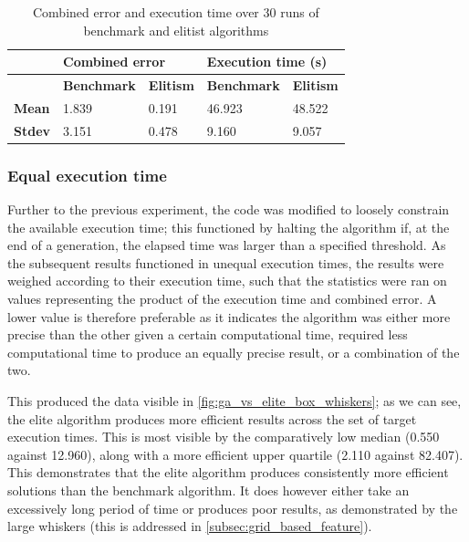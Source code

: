 \documentclass[authoryearcitations]{UoYCSproject}
\begin{document}
\begin{table}
\centering
\begin{tabular}{|l|l|l|l|l|}
\hline & \multicolumn{2}{l|}{\textbf{Combined error}} & \multicolumn{2}{l|}{\textbf{Execution time (s)}} \\ \hline & 
\textbf{Benchmark} & \textbf{Elitism}& \textbf{Benchmark}   & \textbf{Elitism}  \\ \hline 
\textbf{Mean} & 1.839   & 0.191  & 46.923 & 48.522  \\ \hline
\textbf{Stdev}  & 3.151   & 0.478 & 9.160 & 9.057 \\ \hline
\end{tabular}
\caption[Effects of elitist against tournament selection (table)]{Combined error and execution time over 30 runs of benchmark and elitist algorithms}
\label{tab:ga_vs_elite_eq_pop_gen}
\end{table}

\subsubsection{Equal execution time}
\label{subsec:ga_vs_elite_time_sweep}
Further to the previous experiment, the code was modified to loosely constrain the available execution time; this functioned by halting the algorithm if, at the end of a generation, the elapsed time was larger than a specified threshold. As the subsequent results functioned in unequal execution times, the results were weighed according to their execution time, such that the statistics were ran on values representing the product of the execution time and combined error. A lower value is therefore preferable as it indicates the algorithm was either more precise than the other given a certain computational time, required less computational time to produce an equally precise result, or a combination of the two. 

This produced the data visible in \autoref{fig:ga_vs_elite_box_whiskers}; as we can see, the elite algorithm produces more efficient results across the set of target execution times. This is most visible by the comparatively low median (0.550 against 12.960), along with a more efficient upper quartile (2.110 against 82.407). This demonstrates that the elite algorithm produces consistently more efficient solutions than the benchmark algorithm. It does however either take an excessively long period of time or produces poor results, as demonstrated by the large whiskers (this is addressed in \autoref{subsec:grid_based_feature}).
\end{document}
